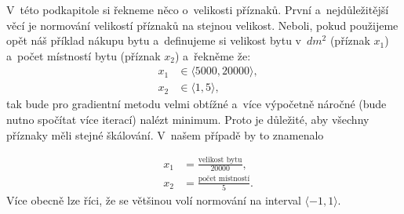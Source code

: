 \par{V~této podkapitole si řekneme něco o~velikosti příznaků. První a~nejdůležitější věcí je normování velikostí příznaků na stejnou velikost. Neboli, pokud použijeme opět náš příklad nákupu bytu a~definujeme si velikost bytu v~$dm^2$ (příznak $x_1$) a~počet místností bytu (příznak $x_2$) a~řekněme že:
\begin{eqnarray}
	\nonumber
	&x_1 &\in \langle 5000, 20000 \rangle,\\
	\nonumber
	&x_2 &\in \langle 1, 5 \rangle,
\end{eqnarray}
tak bude pro gradientní metodu velmi obtížné a~více výpočetně náročné (bude nutno spočítat více iterací) nalézt minimum. Proto je důležité, aby všechny příznaky měli stejné škálování. V~našem případě by to znamenalo 

\begin{eqnarray}
	\nonumber
	&x_1 &= \frac{\mbox{velikost bytu}}{20000},\\
	\nonumber
	&x_2 &= \frac{\mbox{počet místností}}{5}.
\end{eqnarray}
Více obecně lze říci, že se většinou volí normování na interval $\langle -1, 1 \rangle$.}


